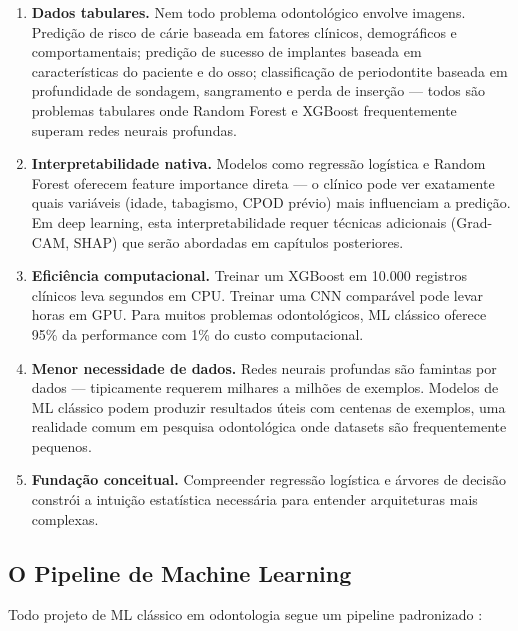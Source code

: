 \begin{enumerate}
    \item \textbf{Dados tabulares.} Nem todo problema odontológico envolve imagens. Predição de risco de cárie baseada em fatores clínicos, demográficos e comportamentais; predição de sucesso de implantes baseada em características do paciente e do osso; classificação de periodontite baseada em profundidade de sondagem, sangramento e perda de inserção — todos são problemas tabulares onde Random Forest e XGBoost frequentemente superam redes neurais profundas.
    
    \item \textbf{Interpretabilidade nativa.} Modelos como regressão logística e Random Forest oferecem feature importance direta — o clínico pode ver exatamente quais variáveis (idade, tabagismo, CPOD prévio) mais influenciam a predição. Em deep learning, esta interpretabilidade requer técnicas adicionais (Grad-CAM, SHAP) que serão abordadas em capítulos posteriores.
    
    \item \textbf{Eficiência computacional.} Treinar um XGBoost em 10.000 registros clínicos leva segundos em CPU. Treinar uma CNN comparável pode levar horas em GPU. Para muitos problemas odontológicos, ML clássico oferece 95\% da performance com 1\% do custo computacional.
    
    \item \textbf{Menor necessidade de dados.} Redes neurais profundas são famintas por dados — tipicamente requerem milhares a milhões de exemplos. Modelos de ML clássico podem produzir resultados úteis com centenas de exemplos, uma realidade comum em pesquisa odontológica onde datasets são frequentemente pequenos.
    
    \item \textbf{Fundação conceitual.} Compreender regressão logística e árvores de decisão constrói a intuição estatística necessária para entender arquiteturas mais complexas.
\end{enumerate}

\subsection{O Pipeline de Machine Learning}

Todo projeto de ML clássico em odontologia segue um pipeline padronizado :

